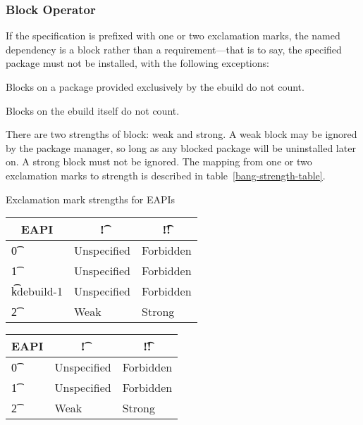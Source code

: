 \subsubsection{Block Operator}

If the specification is prefixed with one or two exclamation marks, the named dependency is a block
rather than a requirement---that is to say, the specified package must not be installed, with the
following exceptions:

\begin{compactitem}
\item Blocks on a package provided exclusively by the ebuild do not count. \label{provided-blocks}
\item Blocks on the ebuild itself do not count.
\end{compactitem}

There are two strengths of block: weak and strong. A weak block may be ignored by the package
manager, so long as any blocked package will be uninstalled later on. A strong block must not be
ignored. The mapping from one or two exclamation marks to strength is described in
table~\ref{bang-strength-table}.

\begin{centertable}{Exclamation mark strengths for EAPIs} \label{bang-strength-table}
\IFKDEBUILDELSE
{
    \begin{tabular}{ l l l }
        \toprule
            \multicolumn{1}{c}{\textbf{EAPI}} &
            \multicolumn{1}{c}{\textbf{\t{!}}} &
            \multicolumn{1}{c}{\textbf{\t{!!}}} \\
            \midrule
    \t{0} & Unspecified & Forbidden \\
    \t{1} & Unspecified & Forbidden \\
    \t{kdebuild-1} & Unspecified & Forbidden \\
    \t{2} & Weak & Strong \\
    \bottomrule
    \end{tabular}
}{
    \begin{tabular}{ l l l }
        \toprule
            \multicolumn{1}{c}{\textbf{EAPI}} &
            \multicolumn{1}{c}{\textbf{\t{!}}} &
            \multicolumn{1}{c}{\textbf{\t{!!}}} \\
            \midrule
    \t{0} & Unspecified & Forbidden \\
    \t{1} & Unspecified & Forbidden \\
    \t{2} & Weak & Strong \\
    \bottomrule
    \end{tabular}
}
\end{centertable}

